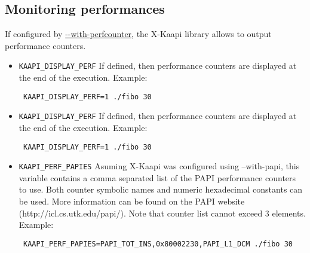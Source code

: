 \documentclass{article}
\newcommand{\kaapi}{\textsc{X}-Kaapi\xspace}
\begin{document}
\subsection{Monitoring performances}
If configured by \url{--with-perfcounter}, the \kaapi library allows to
output performance counters.

\begin{itemize}
\item \verb+KAAPI_DISPLAY_PERF+\newline
If defined, then performance counters are displayed at the end of the execution.
Example:
\begin{verbatim}
 KAAPI_DISPLAY_PERF=1 ./fibo 30
\end{verbatim}

\item \verb+KAAPI_DISPLAY_PERF+\newline
If defined, then performance counters are displayed at the end of the execution.
Example:
\begin{verbatim}
 KAAPI_DISPLAY_PERF=1 ./fibo 30
\end{verbatim}

\item \verb+KAAPI_PERF_PAPIES+\newline
Asuming \kaapi was configured using --with-papi, this variable contains a
comma separated list of the PAPI performance counters to use.
Both counter symbolic names and numeric hexadecimal constants can be used.
More information can be found on the PAPI website
(http://icl.cs.utk.edu/papi/).
Note that counter list cannot exceed 3 elements.
Example:
\begin{verbatim}
 KAAPI_PERF_PAPIES=PAPI_TOT_INS,0x80002230,PAPI_L1_DCM ./fibo 30
\end{verbatim}

\end{itemize}
\end{document}
